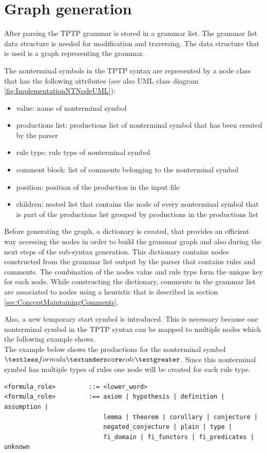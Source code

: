 \section{Graph generation}\label{sec:ConceptGraphGeneration}

After parsing the \ac{TPTP} grammar is stored in a grammar list. The grammar list data structure is needed for modification and traversing.
The data structure that is used is a graph representing the grammar.

The nonterminal symbols in the \ac{TPTP} syntax are represented by a node class that has the following attributes (see also UML class diagram \ref{fig:ImplementationNTNodeUML}):
\begin{itemize}
\item value: name of nonterminal symbol
\item productions list: productions list of nonterminal symbol that has been created by the parser
\item rule type: rule type of nonterminal symbol
\item comment block: list of comments belonging to the nonterminal symbol
\item position: position of the production in the input file
\item children: nested list that contains the node of every nonterminal symbol that is part of the productions list grouped by productions in the productions list
\end{itemize}

Before generating the graph, a dictionary is created, that provides an efficient way accessing the nodes in order to build the grammar graph and also during the next steps of the sub-syntax generation.
This dictionary contains nodes constructed from the grammar list output by the parser that contains rules and comments. The combination of the nodes value and rule type form the unique key for each node. While constructing the dictionary, comments in the grammar list are associated to nodes using a heuristic that is described in section \ref{sec:ConceptMaintainingComments}.

Also, a new temporary start symbol is introduced.
This is necessary because one nonterminal symbol in the \ac{TPTP} syntax can be mapped to multiple nodes which the following example shows. \\
The example below shows the productions for the nonterminal symbol $\textless formula\textunderscore role\textgreater$.
Since this nonterminal symbol has multiple types of rules one node will be created for each rule type.
\begin{lstlisting}[caption= Productions of the nonterminal symbol $\textless formula\textunderscore role\textgreater$]
<formula_role>         ::= <lower_word>
<formula_role>         :== axiom | hypothesis | definition | assumption |
                           lemma | theorem | corollary | conjecture |
                           negated_conjecture | plain | type |
                           fi_domain | fi_functors | fi_predicates | unknown
\end{lstlisting}

